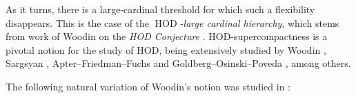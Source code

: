 \documentclass[11pt]{amsart}
\theoremstyle{definition}
\theoremstyle{remark}
\newtheorem{fact}[theorem]{Fact}
\DeclareMathOperator{\crit}{crit}
\DeclareMathOperator{\HOD}{HOD}
\DeclareMathOperator{\Add}{Add}
\newcommand\ale[1]{\marginpar{Alejandro: #1}}
\begin{document}

As it turns, there is a large-cardinal threshold for which such a flexibility disappears. This is the case of the \emph{$\HOD$-large cardinal hierarchy}, which stems from work of Woodin on the \emph{HOD Conjecture} \cite{WoodinPartI}. HOD-supercompactness is a pivotal notion for the study of HOD, being extensively studied by Woodin \cite{midrasha, WoodinPartI}, Sargsyan \cite{Sargsyan2008}, Apter--Friedman--Fuchs \cite{APTER2021102901} and Goldberg--Osinski--Poveda \cite{GOP}, among others.

\smallskip

The following natural variation of Woodin's notion was studied in  \cite{APTER2021102901}:
\end{document}
